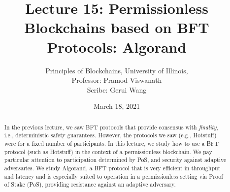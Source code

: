 \documentclass{article}
\title{Lecture 15: Permissionless Blockchains based on BFT Protocols: Algorand }
\author{Principles of Blockchains, University of Illinois,  \\ Professor:  Pramod Viswanath \\ Scribe:  Gerui Wang}
\date{March 18, 2021}
\begin{document}
\maketitle

\begin{abstract}
In the previous lecture, we saw BFT protocols that provide consensus with {\em finality}, i.e., deterministic safety guarantees. However, the protocols we saw (e.g., Hotstuff) were for a fixed number of participants. In this lecture, we study how to use a BFT protocol (such as Hotstuff) in the context of a permissionless blockchain. We pay particular attention to participation determined by PoS, and security against adaptive adversaries. We study  Algorand, a BFT protocol that is very efficient in throughput and latency and  is  especially suited to operation in a permissionless setting via Proof of Stake (PoS), providing resistance against an adaptive adversary. 
\end{abstract}




\end{document}
